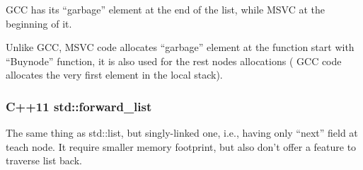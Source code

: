 {GCC has its ``garbage'' element at the end of the list, while MSVC at the beginning of it}.



{Unlike GCC, MSVC code allocates ``garbage'' element at the function start with ``Buynode'' function,
it is also used for the rest nodes allocations} (
{GCC code allocates the very first element in the local stack}).



\subsubsection{C++11 std::forward\_list}

{The same thing as std::list, but singly-linked one, i.e., having only ``next'' field at teach node}.
{It require smaller memory footprint, but also don't offer a feature to traverse list back}.

